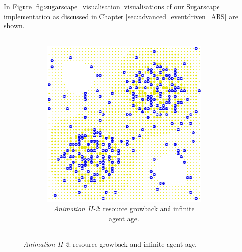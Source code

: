 In Figure \ref{fig:sugarscape_visualisation} visualisations of our Sugarscape implementation as discussed in Chapter \ref{sec:advanced_eventdriven_ABS} are shown.


\begin{figure}[H]
\begin{center}
	\begin{tabular}{c c}
		\begin{subfigure}[b]{0.4\textwidth}
			\centering
			\includegraphics[width=1\textwidth, angle=0]{./fig/background/abs/sugarscape_normal.png}
			\caption{\textit{Animation II-2}: resource growback and infinite agent age.}
			\label{fig:sugarscape_visualisation_normal}
		\end{subfigure}
		
		&
    	

\end{tabular}
\end{center}
\end{figure}
